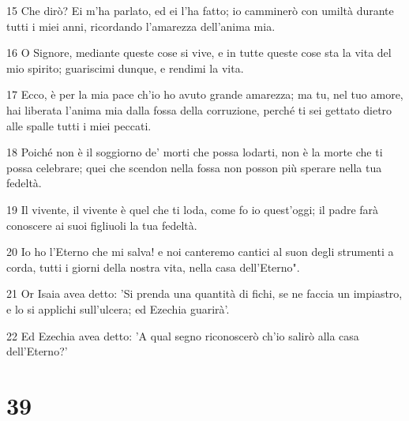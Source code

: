 \par 15 Che dirò? Ei m'ha parlato, ed ei l'ha fatto; io camminerò con umiltà durante tutti i miei anni, ricordando l'amarezza dell'anima mia.
\par 16 O Signore, mediante queste cose si vive, e in tutte queste cose sta la vita del mio spirito; guariscimi dunque, e rendimi la vita.
\par 17 Ecco, è per la mia pace ch'io ho avuto grande amarezza; ma tu, nel tuo amore, hai liberata l'anima mia dalla fossa della corruzione, perché ti sei gettato dietro alle spalle tutti i miei peccati.
\par 18 Poiché non è il soggiorno de' morti che possa lodarti, non è la morte che ti possa celebrare; quei che scendon nella fossa non posson più sperare nella tua fedeltà.
\par 19 Il vivente, il vivente è quel che ti loda, come fo io quest'oggi; il padre farà conoscere ai suoi figliuoli la tua fedeltà.
\par 20 Io ho l'Eterno che mi salva! e noi canteremo cantici al suon degli strumenti a corda, tutti i giorni della nostra vita, nella casa dell'Eterno".
\par 21 Or Isaia avea detto: 'Si prenda una quantità di fichi, se ne faccia un impiastro, e lo si applichi sull'ulcera; ed Ezechia guarirà'.
\par 22 Ed Ezechia avea detto: 'A qual segno riconoscerò ch'io salirò alla casa dell'Eterno?'

\chapter{39}

